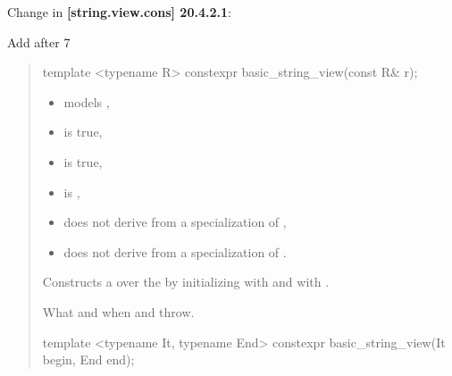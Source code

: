\documentclass{wg21}
\begin{document}
Change in \textbf{[string.view.cons] 20.4.2.1}:

Add after 7

\begin{quote}
\begin{addedblock}
\begin{itemdecl}
template <typename R>
constexpr basic_string_view(const R& r);

\end{itemdecl}

\begin{itemdescr}
    \constraints
    \begin{itemize}
        \item {} models ,
        \item {} is true,
        \item {} is true,
        \item {} is ,
        \item {} does not derive from a specialization of ,
        \item {} does not derive from a specialization of .
    \end{itemize}

    \effects
    Constructs a  over the   by initializing  with  and  with .


    \throws
    What and when  and  throw.



\end{itemdescr}

\begin{itemdecl}
template <typename It, typename End>
constexpr basic_string_view(It begin, End end);

\end{itemdecl}


\end{addedblock}
\end{quote}
\end{document}
